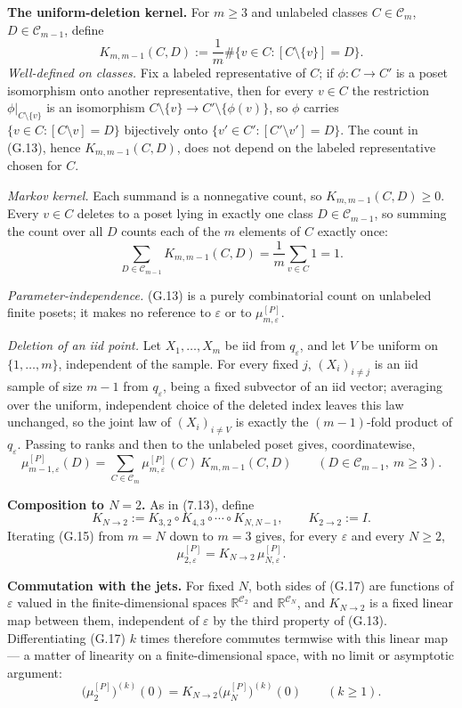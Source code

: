 \documentclass[11pt]{article}
\begin{document}
\textbf{The uniform-deletion kernel.} For \(m\ge3\) and unlabeled classes \(C\in\mathcal C_m\), \(D\in\mathcal C_{m-1}\), define \[ K_{m,m-1}(C,D) :=\frac1m\#\{v\in C:[C\setminus\{v\}]=D\}. \tag{G.13} \] \emph{Well-defined on classes.} Fix a labeled representative of \(C\); if \(\phi:C\to C'\) is a poset isomorphism onto another representative, then for every \(v\in C\) the restriction \(\phi|_{C\setminus\{v\}}\) is an isomorphism \(C\setminus\{v\}\to C'\setminus\{\phi(v)\}\), so \(\phi\) carries \(\{v\in C:[C\setminus v]=D\}\) bijectively onto \(\{v'\in C':[C'\setminus v']=D\}\). The count in (G.13), hence \(K_{m,m-1}(C,D)\), does not depend on the labeled representative chosen for \(C\).

\emph{Markov kernel.} Each summand is a nonnegative count, so \(K_{m,m-1}(C,D)\ge0\). Every \(v\in C\) deletes to a poset lying in exactly one class \(D\in\mathcal C_{m-1}\), so summing the count over all \(D\) counts each of the \(m\) elements of \(C\) exactly once: \[ \sum_{D\in\mathcal C_{m-1}}K_{m,m-1}(C,D)=\frac1m\sum_{v\in C}1=1. \tag{G.14} \]

\emph{Parameter-independence.} (G.13) is a purely combinatorial count on unlabeled finite posets; it makes no reference to \(\varepsilon\) or to \(\mu_{m,\varepsilon}^{[P]}\).

\emph{Deletion of an iid point.} Let \(X_1,\dots,X_m\) be iid from \(q_\varepsilon\), and let \(V\) be uniform on \(\{1,\dots,m\}\), independent of the sample. For every fixed \(j\), \((X_i)_{i\ne j}\) is an iid sample of size \(m-1\) from \(q_\varepsilon\), being a fixed subvector of an iid vector; averaging over the uniform, independent choice of the deleted index leaves this law unchanged, so the joint law of \((X_i)_{i\ne V}\) is exactly the \((m-1)\)-fold product of \(q_\varepsilon\). Passing to ranks and then to the unlabeled poset gives, coordinatewise, \[ \boxed{ \mu_{m-1,\varepsilon}^{[P]}(D) =\sum_{C\in\mathcal C_m} \mu_{m,\varepsilon}^{[P]}(C)\,K_{m,m-1}(C,D) } \qquad(D\in\mathcal C_{m-1},\ m\ge3). \tag{G.15} \]

\textbf{Composition to \(N=2\).} As in (7.13), define \[ K_{N\to2}:=K_{3,2}\circ K_{4,3}\circ\cdots\circ K_{N,N-1}, \qquad K_{2\to2}:=I. \tag{G.16} \] Iterating (G.15) from \(m=N\) down to \(m=3\) gives, for every \(\varepsilon\) and every \(N\ge2\), \[ \mu_{2,\varepsilon}^{[P]}=K_{N\to2}\,\mu_{N,\varepsilon}^{[P]}. \tag{G.17} \]

\textbf{Commutation with the jets.} For fixed \(N\), both sides of (G.17) are functions of \(\varepsilon\) valued in the finite-dimensional spaces \(\mathbb R^{\mathcal C_2}\) and \(\mathbb R^{\mathcal C_N}\), and \(K_{N\to2}\) is a fixed linear map between them, independent of \(\varepsilon\) by the third property of (G.13). Differentiating (G.17) \(k\) times therefore commutes termwise with this linear map --- a matter of linearity on a finite-dimensional space, with no limit or asymptotic argument: \[ \boxed{ \bigl(\mu_2^{[P]}\bigr)^{(k)}(0) =K_{N\to2}\bigl(\mu_N^{[P]}\bigr)^{(k)}(0) } \qquad(k\ge1). \tag{G.18} \]
\end{document}
